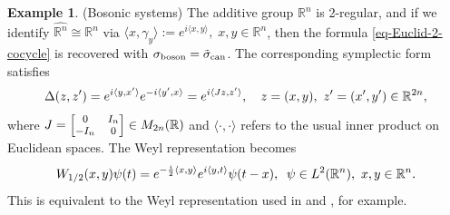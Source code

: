 \documentclass[12pt,reqno]{amsart}
\theoremstyle{definition}
\newtheorem{ex}[thm]{Example}
\theoremstyle{definition}
\theoremstyle{definition}
\numberwithin{thm}{section}
\numberwithin{equation}{section}
\newcommand{\Real}{\mathbb R}
\newcommand{\la}{\langle}
\newcommand{\ra}{\rangle}
\begin{document}
\begin{ex} (Bosonic systems) The additive group $\Real^n$ is 2-regular, and if we identify $\widehat{\Real^n}\cong {\Real^n}$ via $\la x, \gamma_y\ra:=e^{i \la x, y\ra},\; x,y\in \Real^n$, then the formula \eqref{eq-Euclid-2-cocycle} is recovered with $\sigma_{\rm boson}=\tilde{\sigma}_{\rm can}$. The corresponding symplectic form satisfies
\begin{equation}
\notag     \Delta(z,z')=e^{i \la y, x'\ra}e^{-i\la y',x\ra}=e^{i\la Jz,z'\ra}, \ \ \ z=(x,y), \ z'=(x',y')\in\Real^{2n},
\end{equation}
where $J={\footnotesize \begin{bmatrix}0 & I_n\\ -I_n & 0\end{bmatrix}}\in M_{2n}(\Real)$
and $\la \cdot, \cdot \ra$ refers to the usual inner product on Euclidean spaces. The Weyl representation becomes
\begin{equation}
\notag     W_{1/2}(x,y)\psi(t)=e^{-\frac{i}{2} \la x, y\ra}e^{i \la y, t\ra} \psi(t-x),\;\; \psi\in L^2(\Real^n), \ x,y\in\Real^n.
\end{equation}
This is equivalent to the Weyl representation used in \cite[\S 12.2]{Hol} and \cite[\S 1.3]{Folland-book}, for example.
\end{ex}
\end{document}
